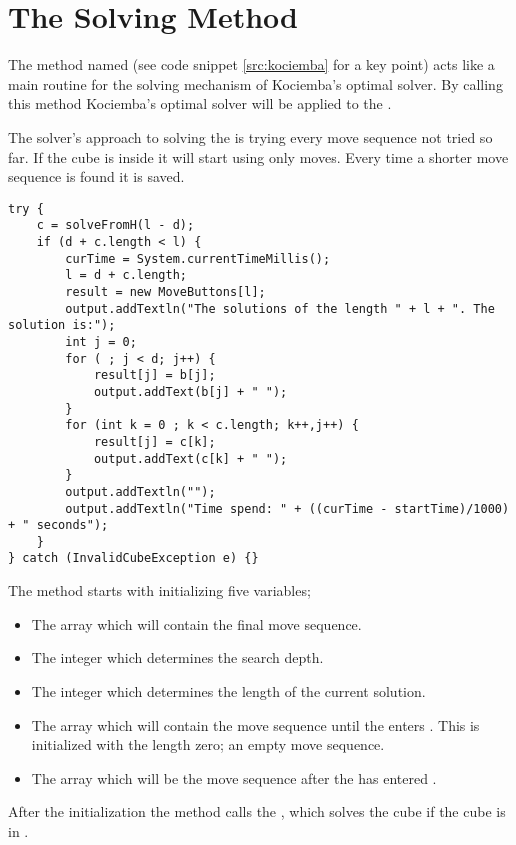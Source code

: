 \section{The Solving Method}
\label{sec:kSolve}
The method named  (see code snippet \ref{src:kociemba} for a key point) acts like a main routine for the solving mechanism of Kociemba's optimal solver. By calling this method Kociemba's optimal solver will be applied to the \rubik{}. 

The solver's approach to solving the \rubik{} is trying every move sequence not tried so far. If the cube is inside  it will start using only  moves. Every time a shorter move sequence is found it is saved. 

\begin{lstlisting}[style=sourceCode, caption=\myCaption{Key point in the solve method of Kociemba's optimal solver}, label=src:kociemba]
try {
	c = solveFromH(l - d);
	if (d + c.length < l) {
		curTime = System.currentTimeMillis();
		l = d + c.length;
		result = new MoveButtons[l];
		output.addTextln("The solutions of the length " + l + ". The solution is:");
		int j = 0;
		for ( ; j < d; j++) {
			result[j] = b[j];
			output.addText(b[j] + " ");
		}
		for (int k = 0 ; k < c.length; k++,j++) {
			result[j] = c[k];
			output.addText(c[k] + " ");
		}
		output.addTextln("");
		output.addTextln("Time spend: " + ((curTime - startTime)/1000) + " seconds");
	}
} catch (InvalidCubeException e) {}
\end{lstlisting}

The  method starts with initializing five variables; 
\begin{itemize}
\item The array  which will contain the final move sequence.
\item The integer  which determines the search depth. 
\item The integer  which determines the length of the current solution. 
\item The array  which will contain the move sequence until the \rubik{} enters . This is initialized with the length zero; an empty move sequence. 
\item The array  which will be the move sequence after the \rubik{} has entered .
\end{itemize}

After the initialization the  method calls the , which solves the cube if the cube is in . 

